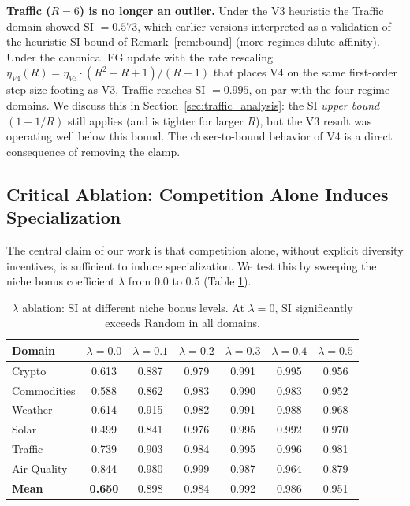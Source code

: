 \documentclass{article}
\begin{document}
\textbf{Traffic ($R = 6$) is no longer an outlier.} Under the V3 heuristic the
Traffic domain showed SI $= 0.573$, which earlier versions interpreted as a
validation of the heuristic SI bound of Remark~\ref{rem:bound} (more regimes
dilute affinity).
Under the canonical EG update with the rate rescaling
$\eta_{V4}(R) = \eta_{V3}\cdot (R^2 - R + 1)/(R - 1)$ that places V4 on the
same first-order step-size footing as V3, Traffic reaches SI $= 0.995$, on
par with the four-regime domains. We discuss this in
Section~\ref{sec:traffic_analysis}: the SI \emph{upper bound} $(1 - 1/R)$
still applies (and is tighter for larger $R$), but the V3 result was
operating well below this bound. The closer-to-bound behavior of V4 is a
direct consequence of removing the clamp.

\subsection{Critical Ablation: Competition Alone Induces Specialization}

The central claim of our work is that competition alone, without explicit diversity incentives, is sufficient to induce specialization. We test this by sweeping the niche bonus coefficient $\lambda$ from 0.0 to 0.5 (Table \ref{tab:lambda}).

\begin{table}[t]
\centering
\small
\caption{$\lambda$ ablation: SI at different niche bonus levels. At $\lambda = 0$, SI significantly exceeds Random in all domains.}
\label{tab:lambda}
\begin{tabular}{lcccccc}
\toprule
\textbf{Domain} & $\lambda = 0.0$ & $\lambda = 0.1$ & $\lambda = 0.2$ & $\lambda = 0.3$ & $\lambda = 0.4$ & $\lambda = 0.5$ \\
\midrule
Crypto & 0.613 & 0.887 & 0.979 & 0.991 & 0.995 & 0.956 \\
Commodities & 0.588 & 0.862 & 0.983 & 0.990 & 0.983 & 0.952 \\
Weather & 0.614 & 0.915 & 0.982 & 0.991 & 0.988 & 0.968 \\
Solar & 0.499 & 0.841 & 0.976 & 0.995 & 0.992 & 0.970 \\
Traffic & 0.739 & 0.903 & 0.984 & 0.995 & 0.996 & 0.981 \\
Air Quality & 0.844 & 0.980 & 0.999 & 0.987 & 0.964 & 0.879 \\
\midrule
\textbf{Mean} & \textbf{0.650} & 0.898 & 0.984 & 0.992 & 0.986 & 0.951 \\
\bottomrule
\end{tabular}
\end{table}
\end{document}

